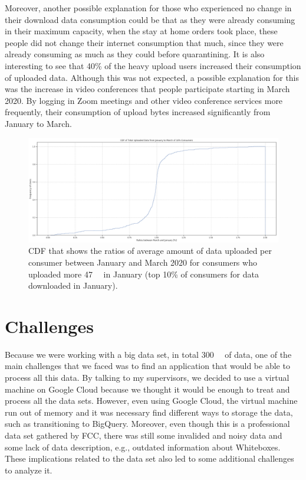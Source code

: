 \documentclass[conference,10pt]{IEEEtran}
\begin{document}
Moreover, another possible explanation for those who experienced no change in their download data consumption could be that as they were already consuming in their maximum capacity, when the stay at home orders took place, these people did not change their internet consumption that much, since they were already consuming as much as they could before quarantining. It is also interesting to see that 40\% of the heavy upload users increased their consumption of uploaded data. Although this was not expected, a possible explanation for this was the increase in video conferences that people participate starting in March 2020. By logging in Zoom meetings and other video conference services more frequently, their consumption of upload bytes increased significantly from January to March.
\begin{figure}
\centering
\includegraphics[width=1.0\linewidth]{figs/heavyup.PNG}
\caption{CDF that shows the ratios of average amount of data uploaded per consumer between January and March 2020 for consumers who uploaded more \SI{47}{\giga\byte} in January (top 10\% of consumers for data downloaded in January).}
\label{fig:heavyup}
\end{figure}

\section{Challenges}
\label{sec:challenges}
Because we were working with a big data set, in total \SI{300}{\giga\byte} of data, one of the main challenges that we faced was to find an application that would be able to process all this data. By talking to my supervisors, we decided to use a virtual machine on Google Cloud because we thought it would be enough to treat and process all the data sets. However, even using Google Cloud, the virtual machine run out of memory and it was necessary find different ways to storage the data, such as transitioning to BigQuery. Moreover, even though this is a professional data set gathered by FCC, there was still some invalided and noisy data and some lack of data description, e.g., outdated information about Whiteboxes. These implications related to the data set also led to some additional challenges to analyze it.
\end{document}
